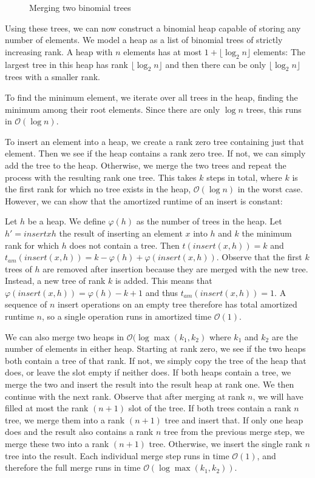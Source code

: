 \begin{figure}[h]
\begin{center}
    
\end{center}
\caption{Merging two binomial trees}
\label{fig:binomial:merge}
\end{figure}

Using these trees, we can now construct a binomial heap capable of storing any number of elements. We model a heap as a list of binomial trees of strictly increasing rank. A heap with $n$ elements has at most $1 + \lfloor \log_2 n \rfloor$ elements: The largest tree in this heap has rank $\lfloor \log_2 n \rfloor$ and then there can be only $\lfloor \log_2 n \rfloor$ trees with a smaller rank.

To find the minimum element, we iterate over all trees in the heap, finding the minimum among their root elements. Since there are only $\log n$ trees, this runs in $\mathcal O(\log n)$.

To insert an element into a heap, we create a rank zero tree containing just that element. Then we see if the heap contains a rank zero tree. If not, we can simply add the tree to the heap. Otherwise, we merge the two trees and repeat the process with the resulting rank one tree. This takes $k$ steps in total, where $k$ is the first rank for which no tree exists in the heap, $\mathcal O(\log n)$ in the worst case. However, we can show that the amortized runtime of an insert is constant:

Let $h$ be a heap. We define $\varphi(h)$ as the number of trees in the heap. Let $h' = insert x h$ the result of inserting an element $x$ into $h$ and $k$ the minimum rank for which $h$ does not contain a tree. Then $t(insert(x, h)) = k$ and $t_{am}(insert(x, h)) = k - \varphi(h) + \varphi(insert(x, h))$. Observe that the first $k$ trees of $h$ are removed after insertion because they are merged with the new tree. Instead, a new tree of rank $k$ is added. This means that $\varphi(insert(x, h)) = \varphi(h) - k + 1$ and thus $t_{am}(insert(x, h)) = 1$. A sequence of $n$ insert operations on an empty tree therefore has total amortized runtime $n$, so a single operation runs in amortized time $\mathcal O(1)$.

We can also merge two heaps in $\mathcal O(\log \max(k_1, k_2)$ where $k_1$ and $k_2$ are the number of elements in either heap. Starting at rank zero, we see if the two heaps both contain a tree of that rank. If not, we simply copy the tree of the heap that does, or leave the slot empty if neither does. If both heaps contain a tree, we merge the two and insert the result into the result heap at rank one. We then continue with the next rank. Observe that after merging at rank $n$, we will have filled at most the rank $(n+1)$ slot of the tree. If both trees contain a rank $n$ tree, we merge them into a rank $(n+1)$ tree and insert that. If only one heap does and the result also contains a rank $n$ tree from the previous merge step, we merge these two into a rank $(n+1)$ tree. Otherwise, we insert the single rank $n$ tree into the result. Each individual merge step runs in time $\mathcal O(1)$, and therefore the full merge runs in time $\mathcal O(\log \max(k_1, k_2))$.

